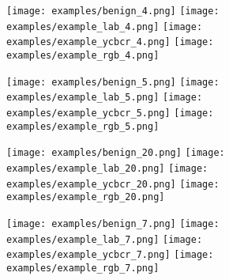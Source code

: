 \begin{figure}[ht]
    \ContinuedFloat
    \begin{subfigure}[b]{\linewidth}
        \caption{}
        \texttt{[image: examples/benign\_4.png]}
        \texttt{[image: examples/example\_lab\_4.png]}
        \texttt{[image: examples/example\_ycbcr\_4.png]}
        \texttt{[image: examples/example\_rgb\_4.png]}
    \end{subfigure}
\end{figure}

\begin{figure}[ht]
    \ContinuedFloat
    \begin{subfigure}[b]{\linewidth}
        \caption{}
        \texttt{[image: examples/benign\_5.png]}
        \texttt{[image: examples/example\_lab\_5.png]}
        \texttt{[image: examples/example\_ycbcr\_5.png]}
        \texttt{[image: examples/example\_rgb\_5.png]}
    \end{subfigure}
\end{figure}

\begin{figure}[ht]
    \ContinuedFloat
    \begin{subfigure}[b]{\linewidth}
        \caption{}
        \texttt{[image: examples/benign\_20.png]}
        \texttt{[image: examples/example\_lab\_20.png]}
        \texttt{[image: examples/example\_ycbcr\_20.png]}
        \texttt{[image: examples/example\_rgb\_20.png]}
    \end{subfigure}
\end{figure}

\begin{figure}[ht]
    \ContinuedFloat
    \begin{subfigure}[b]{\linewidth}
        \caption{}
        \texttt{[image: examples/benign\_7.png]}
        \texttt{[image: examples/example\_lab\_7.png]}
        \texttt{[image: examples/example\_ycbcr\_7.png]}
        \texttt{[image: examples/example\_rgb\_7.png]}
    \end{subfigure}
\end{figure}


